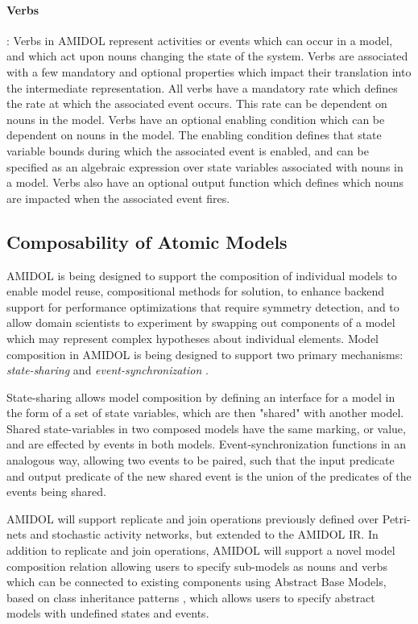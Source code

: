 \documentclass[11pt]{article}
\newcommand{\amidol}{\textsc{AMIDOL}}
\begin{document}
\paragraph{Verbs}: Verbs in \amidol{} represent activities or events which can occur in a model, and which act upon nouns changing the state of the system.  Verbs are associated with a few mandatory and optional properties which impact their translation into the intermediate representation.  All verbs have a mandatory rate which defines the rate at which the associated event occurs.  This rate can be dependent on nouns in the model.  Verbs have an optional enabling condition which can be dependent on nouns in the model.  The enabling condition defines that state variable bounds during which the associated event is enabled, and can be specified as an algebraic expression over state variables associated with nouns in a model.  Verbs also have an optional output function which defines which nouns are impacted when the associated event fires.

\subsection{Composability of Atomic Models}

\amidol{} is being designed to support the composition of individual models to enable model reuse, compositional methods for solution, to enhance backend support for performance optimizations that require symmetry detection, and to allow domain scientists to experiment by swapping out components of a model which may represent complex hypotheses about individual elements.  Model composition in \amidol{} is being designed to support two primary mechanisms: \emph{state-sharing} \cite{sanders1992dependability,sanders1988construction} and \emph{event-synchronization} \cite{lampka2002symbolic}.

State-sharing allows model composition by defining an interface for a model in the form of a set of state variables, which are then "shared" with another model.  Shared state-variables in two composed models have the same marking, or value, and are effected by events in both models.  Event-synchronization functions in an analogous way, allowing two events to be paired, such that the input predicate and output predicate of the new shared event is the union of the predicates of the events being shared.

\amidol{} will support replicate and join operations previously defined over Petri-nets and stochastic activity networks, but extended to the \amidol{} IR. \cite{sanders1995ultrasan}  In addition to replicate and join operations, \amidol{} will support a novel model composition relation allowing users to specify sub-models as nouns and verbs which can be connected to existing components using Abstract Base Models, based on class inheritance patterns \cite{bruce2002foundations}, which allows users to specify abstract models with undefined states and events.
\end{document}
